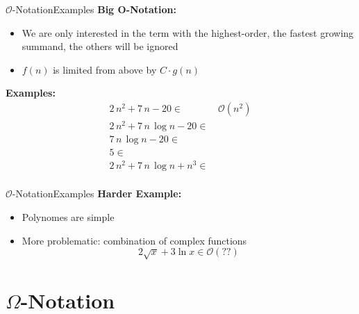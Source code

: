 \begin{frame}{$\mathcal{O}$-Notation}{Examples}
  \textbf{Big O-Notation:}
  \begin{itemize}
    \item
      We are only interested in the term with the highest-order,
      the fastest growing summand, the others will be ignored
    \item
      $f(n)$ is limited {\color{Mittel-Blau}from above} by $C \cdot g(n)$
  \end{itemize}
  \textbf{Examples:}
  \begin{align*}
     2 \, n^2 + 7 \, n - 20 \in & \,\mathcal{O}(n^2)\\
     2 \, n^2 + 7 \, n \, \log n - 20 \in & {}\\
     7 \, n \, \log n - 20 \in & {}\\
     5 \in & {}\\
     2 \, n^2 + 7 \, n \, \log n + n^3 \in & {}\\
  \end{align*}
\end{frame}


\begin{frame}{$\mathcal{O}$-Notation}{Examples}
  \textbf{Harder Example:}
  \begin{itemize}
    \item Polynomes are simple
    \item More problematic: combination of complex functions
      \begin{displaymath}
        2 \sqrt{x} + 3 \ln x \in \mathcal{O} (??)
      \end{displaymath}
  \end{itemize}
\end{frame}


\section{\texorpdfstring{$\Omega$}{Omega}-Notation}

